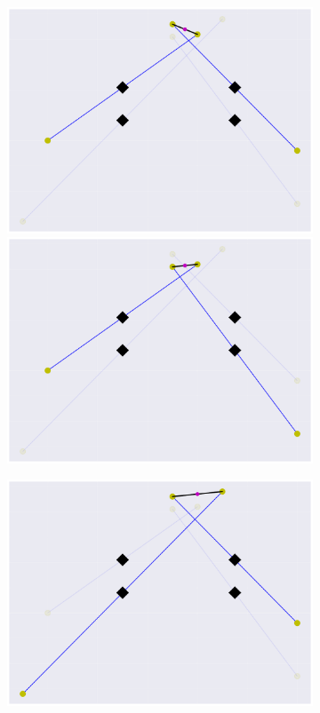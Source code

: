 \begin{figure}
\begin{subfigure}{0.45\textwidth}
        \includegraphics[width=0.8\linewidth]{Plots/stereo_magic_1.pdf}
        \includegraphics[width=0.8\linewidth]{Plots/stereo_magic_3.pdf}
    \end{subfigure}
    \begin{subfigure}{0.45\textwidth}
        \includegraphics[width=0.8\linewidth]{Plots/stereo_magic_4.pdf} 

\end{subfigure}
\end{figure}
